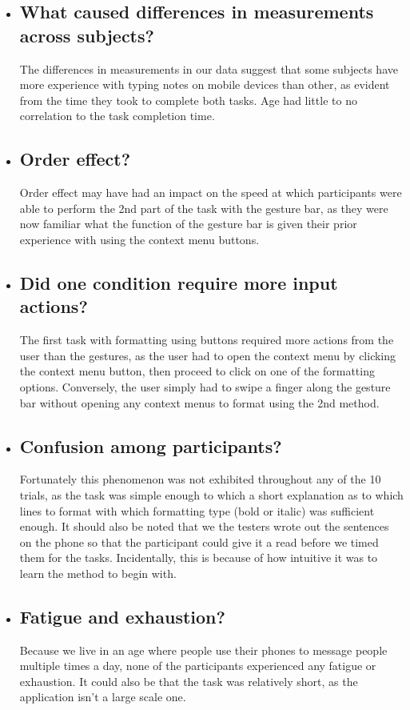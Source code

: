 \documentclass[conference]{IEEEtran}
\begin{document}
\begin{itemize}
    \item \subsection*{What caused differences in measurements across subjects?}
    The differences in measurements in our data suggest that some subjects have more experience with typing notes on mobile devices than other, as evident from the time they took to complete both tasks. Age had little to no correlation to the task completion time.

    \item \subsection*{Order effect?}
    Order effect may have had an impact on the speed at which participants were able to perform the 2nd part of the task with the gesture bar, as they were now familiar what the function of the gesture bar is given their prior experience with using the context menu buttons.

    \item \subsection*{Did one condition require more input actions?}

    The first task with formatting using buttons required more actions from the user than the gestures, as the user had to open the context menu by clicking the context menu button, then proceed to click on one of the formatting options. Conversely, the user simply had to swipe a finger along the gesture bar without opening any context menus to format using the 2nd method.

    \item \subsection*{Confusion among participants?}

    Fortunately this phenomenon was not exhibited throughout any of the 10 trials, as the task was simple enough to which a short explanation as to which lines to format with which formatting type (bold or italic) was sufficient enough. It should also be noted that we the testers wrote out the sentences on the phone so that the participant could give it a read before we timed them for the tasks. Incidentally, this is because of how intuitive it was to learn the method to begin with.

    \item \subsection*{Fatigue and exhaustion?}

    Because we live in an age where people use their phones to message people multiple times a day, none of the participants experienced any fatigue or exhaustion. It could also be that the task was relatively short, as the application isn't a large scale one.
    
\end{itemize}
\end{document}
